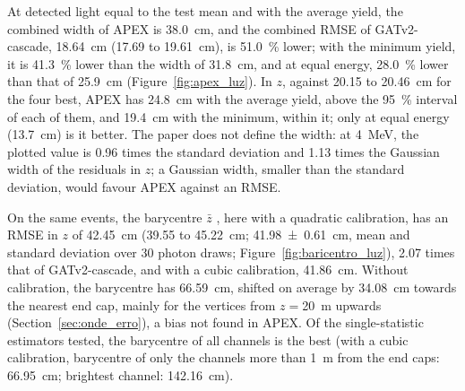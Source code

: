 At detected light equal to the test mean and with the average yield, the combined width of APEX \citep{marinho2025apex} is \qty{38.0}{\cm}, and the combined RMSE of GATv2-cascade, \qty{18.64}{\cm} (\num{17.69} to \qty{19.61}{\cm}), is \qty{51.0}{\percent} lower; with the minimum yield, it is \qty{41.3}{\percent} lower than the width of \qty{31.8}{\cm}, and at equal energy, \qty{28.0}{\percent} lower than that of \qty{25.9}{\cm} (Figure~\ref{fig:apex_luz}). In $z$, against \num{20.15} to \qty{20.46}{\cm} for the four best, APEX has \qty{24.8}{\cm} with the average yield, above the \qty{95}{\percent} interval of each of them, and \qty{19.4}{\cm} with the minimum, within it; only at equal energy (\qty{13.7}{\cm}) is it better. The paper does not define the width: at \qty{4}{\MeV}, the plotted value is \num{0.96} times the standard deviation and \num{1.13} times the Gaussian width of the residuals in $z$; a Gaussian width, smaller than the standard deviation, would favour APEX against an RMSE.

{ On the same events, the barycentre $\bar{z}$ \citep{marinho2025apex}, here with a quadratic calibration, has an RMSE in $z$ of \qty{42.45}{\cm} (\num{39.55} to \qty{45.22}{\cm}; \qty[uncertainty-mode = separate, separate-uncertainty-units = single]{41.98 \pm 0.61}{\cm}, mean and standard deviation over \num{30} photon draws; Figure~\ref{fig:baricentro_luz}), \num{2.07} times that of GATv2-cascade, and with a cubic calibration, \qty{41.86}{\cm}. Without calibration, the barycentre has \qty{66.59}{\cm}, shifted on average by \qty{34.08}{\cm} towards the nearest end cap, mainly for the vertices from $z = {}$\qty{20}{\m} upwards (Section~\ref{sec:onde_erro}), a bias not found in APEX. Of the single-statistic estimators tested, the barycentre of all channels is the best (with a cubic calibration, barycentre of only the channels more than \qty{1}{\m} from the end caps: \qty{66.95}{\cm}; brightest channel: \qty{142.16}{\cm}).\par}


